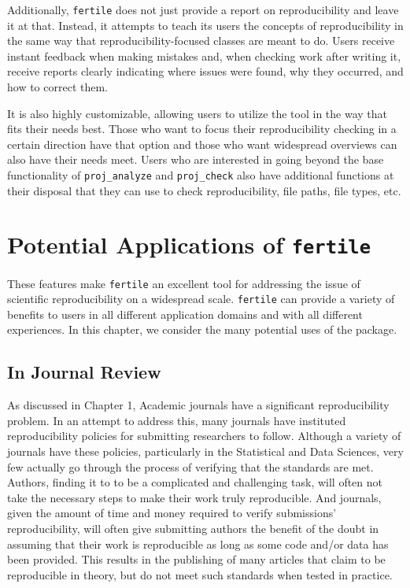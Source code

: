 \documentclass[12pt,twoside]{reedthesis}
\begin{document}
Additionally, \texttt{fertile} does not just provide a report on reproducibility and leave it at that. Instead, it attempts to teach its users the concepts of reproducibility in the same way that reproducibility-focused classes are meant to do. Users receive instant feedback when making mistakes and, when checking work after writing it, receive reports clearly indicating where issues were found, why they occurred, and how to correct them.

It is also highly customizable, allowing users to utilize the tool in the way that fits their needs best. Those who want to focus their reproducibility checking in a certain direction have that option and those who want widespread overviews can also have their needs meet. Users who are interested in going beyond the base functionality of \texttt{proj\_analyze} and \texttt{proj\_check} also have additional functions at their disposal that they can use to check reproducibility, file paths, file types, etc.

\hypertarget{potential-applications-of-fertile}{%
\section{\texorpdfstring{Potential Applications of \texttt{fertile}}{Potential Applications of fertile}}\label{potential-applications-of-fertile}}

These features make \texttt{fertile} an excellent tool for addressing the issue of scientific reproducibility on a widespread scale. \texttt{fertile} can provide a variety of benefits to users in all different application domains and with all different experiences. In this chapter, we consider the many potential uses of the package.

\hypertarget{in-journal-review}{%
\subsection{In Journal Review}\label{in-journal-review}}

As discussed in Chapter 1, Academic journals have a significant reproducibility problem. In an attempt to address this, many journals have instituted reproducibility policies for submitting researchers to follow. Although a variety of journals have these policies, particularly in the Statistical and Data Sciences, very few actually go through the process of verifying that the standards are met. Authors, finding it to to be a complicated and challenging task, will often not take the necessary steps to make their work truly reproducible. And journals, given the amount of time and money required to verify submissions' reproducibility, will often give submitting authors the benefit of the doubt in assuming that their work is reproducible as long as some code and/or data has been provided. This results in the publishing of many articles that claim to be reproducible in theory, but do not meet such standards when tested in practice.
\end{document}
